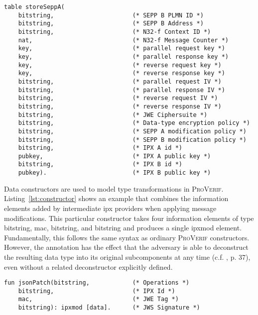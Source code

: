 \begin{lstlisting}[caption={Declaration of local SEPP storage using tables},label={lst:tables},firstnumber=45]
table storeSeppA(
    bitstring,                      (* SEPP B PLMN ID *)
    bitstring,                      (* SEPP B Address *)
    bitstring,                      (* N32-f Context ID *)
    nat,                            (* N32-f Message Counter *)
    key,                            (* parallel request key *)
    key,                            (* parallel response key *)
    key,                            (* reverse request key *)
    key,                            (* reverse response key *)
    bitstring,                      (* parallel request IV *)
    bitstring,                      (* parallel response IV *)
    bitstring,                      (* reverse request IV *)
    bitstring,                      (* reverse response IV *)
    bitstring,                      (* JWE Ciphersuite *)
    bitstring,                      (* Data-type encryption policy *)
    bitstring,                      (* SEPP A modification policy *)
    bitstring,                      (* SEPP B modification policy *)
    bitstring,                      (* IPX A id *)
    pubkey,                         (* IPX A public key *)
    bitstring,                      (* IPX B id *)
    pubkey).                        (* IPX B public key *)
\end{lstlisting}

Data constructors are used to model type transformations in \textsc{ProVerif}.
Listing~\ref{lst:constructor} shows an example that combines the information elements added by intermediate \gls{ipx} providers when applying message modifications.
This particular constructor takes four information elements of type {\sffamily bitstring}, {\sffamily mac}, {\sffamily bitstring}, and {\sffamily bitstring} and produces a single {\sffamily ipxmod} element.
Fundamentally, this follows the same syntax as ordinary \textsc{ProVerif} constructors.
However, the {\sffamily [data]} annotation has the effect that the adversary is able to deconstruct the resulting data type into its original subcomponents at any time (c.f. \cite{blanchet2020proverif}, p. 37), even without a related deconstructor explicitly defined.

\begin{lstlisting}[caption={Definition of custom data constructor},label={lst:constructor},firstnumber=104]
fun jsonPatch(bitstring,            (* Operations *)
    bitstring,                      (* IPX Id *)
    mac,                            (* JWE Tag *)
    bitstring): ipxmod [data].      (* JWS Signature *)
\end{lstlisting}

